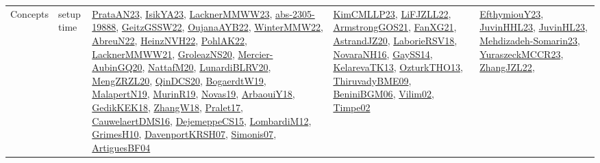 {\begin{longtable}{lp{3cm}>{\raggedright}p{6cm}>{\raggedright}p{6cm}p{8cm}}
Concepts & setup time & \href{articles/PrataAN23.pdf}{PrataAN23}\cite{PrataAN23}, \href{articles/IsikYA23.pdf}{IsikYA23}\cite{IsikYA23}, \href{articles/LacknerMMWW23.pdf}{LacknerMMWW23}\cite{LacknerMMWW23}, \href{articles/abs-2305-19888.pdf}{abs-2305-19888}\cite{abs-2305-19888}, \href{papers/GeitzGSSW22.pdf}{GeitzGSSW22}\cite{GeitzGSSW22}, \href{papers/OujanaAYB22.pdf}{OujanaAYB22}\cite{OujanaAYB22}, \href{papers/WinterMMW22.pdf}{WinterMMW22}\cite{WinterMMW22}, \href{articles/AbreuN22.pdf}{AbreuN22}\cite{AbreuN22}, \href{articles/HeinzNVH22.pdf}{HeinzNVH22}\cite{HeinzNVH22}, \href{articles/PohlAK22.pdf}{PohlAK22}\cite{PohlAK22}, \href{papers/LacknerMMWW21.pdf}{LacknerMMWW21}\cite{LacknerMMWW21}, \href{papers/GroleazNS20.pdf}{GroleazNS20}\cite{GroleazNS20}, \href{papers/Mercier-AubinGQ20.pdf}{Mercier-AubinGQ20}\cite{Mercier-AubinGQ20}, \href{papers/NattafM20.pdf}{NattafM20}\cite{NattafM20}, \href{articles/LunardiBLRV20.pdf}{LunardiBLRV20}\cite{LunardiBLRV20}, \href{articles/MengZRZL20.pdf}{MengZRZL20}\cite{MengZRZL20}, \href{articles/QinDCS20.pdf}{QinDCS20}\cite{QinDCS20}, \href{papers/BogaerdtW19.pdf}{BogaerdtW19}\cite{BogaerdtW19}, \href{papers/MalapertN19.pdf}{MalapertN19}\cite{MalapertN19}, \href{papers/MurinR19.pdf}{MurinR19}\cite{MurinR19}, \href{articles/Novas19.pdf}{Novas19}\cite{Novas19}, \href{papers/ArbaouiY18.pdf}{ArbaouiY18}\cite{ArbaouiY18}, \href{articles/GedikKEK18.pdf}{GedikKEK18}\cite{GedikKEK18}, \href{articles/ZhangW18.pdf}{ZhangW18}\cite{ZhangW18}, \href{papers/Pralet17.pdf}{Pralet17}\cite{Pralet17}, \href{papers/CauwelaertDMS16.pdf}{CauwelaertDMS16}\cite{CauwelaertDMS16}, \href{papers/DejemeppeCS15.pdf}{DejemeppeCS15}\cite{DejemeppeCS15}, \href{articles/LombardiM12.pdf}{LombardiM12}\cite{LombardiM12}, \href{papers/GrimesH10.pdf}{GrimesH10}\cite{GrimesH10}, \href{papers/DavenportKRSH07.pdf}{DavenportKRSH07}\cite{DavenportKRSH07}, \href{articles/Simonis07.pdf}{Simonis07}\cite{Simonis07}, \href{papers/ArtiguesBF04.pdf}{ArtiguesBF04}\cite{ArtiguesBF04} & \href{papers/KimCMLLP23.pdf}{KimCMLLP23}\cite{KimCMLLP23}, \href{papers/LiFJZLL22.pdf}{LiFJZLL22}\cite{LiFJZLL22}, \href{papers/ArmstrongGOS21.pdf}{ArmstrongGOS21}\cite{ArmstrongGOS21}, \href{articles/FanXG21.pdf}{FanXG21}\cite{FanXG21}, \href{articles/AstrandJZ20.pdf}{AstrandJZ20}\cite{AstrandJZ20}, \href{articles/LaborieRSV18.pdf}{LaborieRSV18}\cite{LaborieRSV18}, \href{articles/NovaraNH16.pdf}{NovaraNH16}\cite{NovaraNH16}, \href{papers/GaySS14.pdf}{GaySS14}\cite{GaySS14}, \href{papers/KelarevaTK13.pdf}{KelarevaTK13}\cite{KelarevaTK13}, \href{articles/OzturkTHO13.pdf}{OzturkTHO13}\cite{OzturkTHO13}, \href{papers/ThiruvadyBME09.pdf}{ThiruvadyBME09}\cite{ThiruvadyBME09}, \href{papers/BeniniBGM06.pdf}{BeniniBGM06}\cite{BeniniBGM06}, \href{papers/Vilim02.pdf}{Vilim02}\cite{Vilim02}, \href{articles/Timpe02.pdf}{Timpe02}\cite{Timpe02} & \href{papers/EfthymiouY23.pdf}{EfthymiouY23}\cite{EfthymiouY23}, \href{papers/JuvinHHL23.pdf}{JuvinHHL23}\cite{JuvinHHL23}, \href{papers/JuvinHL23.pdf}{JuvinHL23}\cite{JuvinHL23}, \href{papers/Mehdizadeh-Somarin23.pdf}{Mehdizadeh-Somarin23}\cite{Mehdizadeh-Somarin23}, \href{articles/YuraszeckMCCR23.pdf}{YuraszeckMCCR23}\cite{YuraszeckMCCR23}, \href{papers/ZhangJZL22.pdf}{ZhangJZL22}\cite{ZhangJZL22}, 
\end{longtable}}
